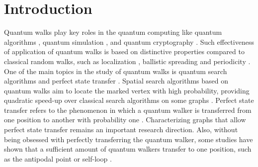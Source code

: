 \documentclass[12pt]{article}
\numberwithin{lemma}{section}
\numberwithin{proposition}{section}
\numberwithin{remark}{section}
\numberwithin{definition}{section}
\begin{document}
\section{Introduction}
    Quantum walks play key roles in the quantum computing like quantum algorithms \cite{Aed,Am1,G}, quantum simulation \cite{QS}, and quantum cryptography \cite{QC}.
    Such effectiveness of application of quantum walks is based on distinctive properties compared to classical random walks, such as localization \cite{IS,IKS,ILS}, ballistic spreading \cite{K} and periodicity \cite{PB, KSTY,HKSSp}.
    One of the main topics in the study of quantum walks is quantum search algorithms \cite{Portugal} and perfect state transfer \cite{Gpst1}. Spatial search algorithms based on quantum walks aim to locate the marked vertex with high probability, providing quadratic speed-up over classical search algorithms on some graphs \cite{ADZ, QCcoupling2}. Perfect state transfer refers to the phenomenon in which a quantum walker is transferred from one position to another with probability one \cite{Gpst2, KS, KY}. Characterizing graphs that allow perfect state transfer remains an important research direction. Also, without being obsessed with perfectly transferring the quantum walker, some studies have shown that a sufficient amount of quantum walkers transfer to one position, such as the antipodal point or self-loop \cite{SSstate}.
    
\end{document}
